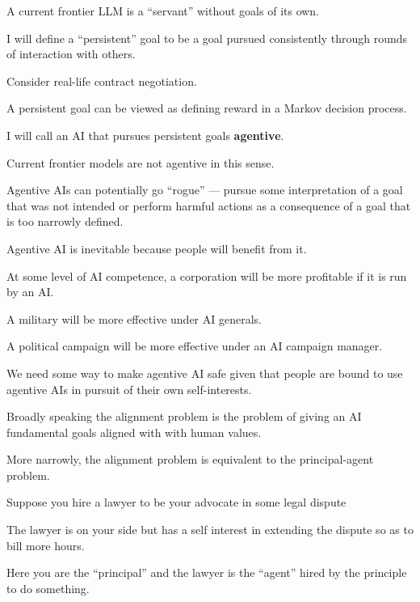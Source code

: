 {\vfill
A current frontier LLM is a ``servant'' without goals of its own.


I will define a ``persistent'' goal to be a goal pursued consistently through rounds of interaction with others.

\vfill
Consider real-life contract negotiation.

\vfill
A persistent goal can be viewed as defining reward in a Markov decision process.


I will call an AI that pursues persistent goals {\bf agentive}.

\vfill
Current frontier models are not agentive in this sense.

\vfill
Agentive AIs can potentially go ``rogue'' --- pursue some interpretation of a goal that was not intended or perform harmful actions as a consequence of a goal that is too narrowly defined.


Agentive AI is inevitable because people will benefit from it.

\vfill
At some level of AI competence, a corporation will be more profitable if it is run by an AI.

\vfill
A military will be more effective under AI generals.

\vfill
A political campaign will be more effective under an AI campaign manager.

\vfill
We need some way to make agentive AI safe given that people are bound to use agentive AIs in pursuit of their own self-interests.


Broadly speaking the alignment problem is the problem of giving an AI fundamental goals aligned with with human values.

\vfill
More narrowly, the alignment problem is equivalent to the principal-agent problem.


Suppose you hire a lawyer to be your advocate in some legal dispute

\vfill
The lawyer is on your side but has a self interest in extending the dispute so as to bill more hours.

\vfill
Here you are the ``principal'' and the lawyer is the ``agent'' hired by the principle to do something.

}
